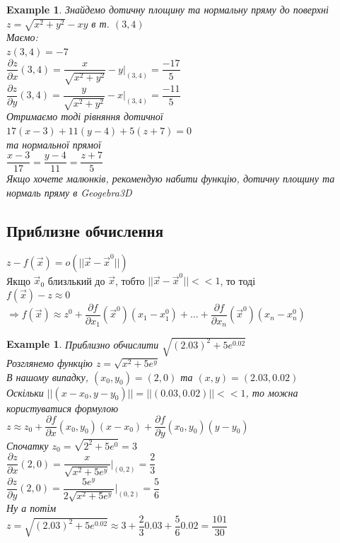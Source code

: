 \documentclass[a4paper, 14pt]{extarticle}
\theoremstyle{theoremdd}
\theoremstyle{theoremdd}
\theoremstyle{theoremdd}
\theoremstyle{theoremdd}
\newtheorem{example}[theorem]{Example}
\theoremstyle{theoremdd}
\theoremstyle{theoremdd}
\theoremstyle{theoremdd}
\theoremstyle{theoremdd}
\def\departial#1#2{\dfrac{\partial {#1}}{\partial {#2}}}
\begin{document}
\begin{example}
Знайдемо дотичну площину та нормальну пряму до поверхні $z = \sqrt{x^2+y^2} - xy$ в т. $(3,4)$\\
Маємо:\\
$z(3,4) = -7$\\
$\departial{z}{x}(3,4) = \dfrac{x}{\sqrt{x^2+y^2}} - y \Big|_{(3,4)} = \dfrac{-17}{5}$\\
$\departial{z}{y}(3,4) = \dfrac{y}{\sqrt{x^2+y^2}} - x \Big|_{(3,4)} = \dfrac{-11}{5}$\\
Отримаємо тоді рівняння дотичної\\
$17(x-3)+11(y-4)+5(z+7) = 0$\\
та нормальної прямої\\
$\dfrac{x-3}{17} = \dfrac{y-4}{11} = \dfrac{z+7}{5}$\\
Якщо хочете малюнків, рекомендую набити функцію, дотичну площину та нормаль пряму в Geogebra3D
\\
\end{example}


\subsection{Приблизне обчислення}
$z-f(\vec{x}) = o(||\vec{x}-\vec{x}^0||)$\\
Якщо $\vec{x}_0$ близлький до $\vec{x}$, тобто $||\vec{x} - \vec{x}^0|| << 1$, то тоді\\
$f(\vec{x})-z \approx 0$\\
$\Rightarrow f(\vec{x}) \approx z^0 + \departial{f}{x_1}(\vec{x}^0)(x_1-x_1^0) + \dots + \departial{f}{x_n}(\vec{x}^0)(x_n-x_n^0)$
\begin{example}
Приблизно обчислити $\sqrt{(2.03)^2 + 5e^{0.02}}$\\
Розглянемо функцію $z = \sqrt{x^2 + 5e^y}$\\
В нашому випадку, $(x_0,y_0) = (2,0)$ та $(x, y) = (2.03, 0.02)$\\
Оскільки $||(x-x_0, y-y_0)|| = ||(0.03, 0.02)|| <<1$, то можна користуватися формулою\\
$z \approx z_0 + \departial{f}{x}(x_0,y_0) (x-x_0) + \departial{f}{y}(x_0,y_0) (y-y_0)$\\
Спочатку $z_0 = \sqrt{2^2 + 5e^0} = 3$\\
$\departial{z}{x}(2,0) = \dfrac{x}{\sqrt{x^2+5e^y}} \Big|_{(0,2)} = \dfrac{2}{3}$\\
$\departial{z}{y}(2,0) = \dfrac{5e^y}{2\sqrt{x^2+5e^y}} \Big|_{(0,2)} = \dfrac{5}{6}$\\
Ну а потім\\
$z = \sqrt{(2.03)^2 + 5e^{0.02}} \approx 3 + \dfrac{2}{3} 0.03 + \dfrac{5}{6} 0.02 = \dfrac{101}{30}$\\
\end{example}
\end{document}
